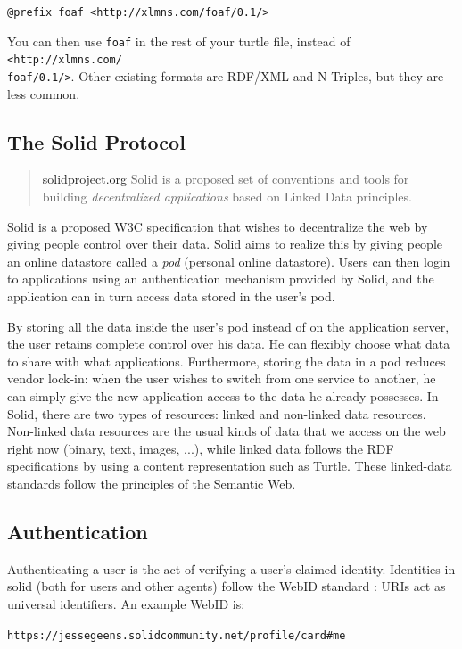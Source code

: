 \texttt{@prefix foaf <http://xlmns.com/foaf/0.1/>}

\noindent You can then use \texttt{foaf} in the rest of your turtle file, instead of \texttt{<http://xlmns.com/\\foaf/0.1/>}. Other existing formats are \gls{RDF}/XML and N-Triples, but they are less common.

\subsection{The Solid Protocol}
\begin{quote}{\href{https://solidproject.org}{solidproject.org}}
    Solid is a proposed set of conventions and tools for building \textit{decentralized applications} based on Linked Data principles.
\end{quote}
\noindent Solid \citep{solid} is a proposed W3C specification that wishes to decentralize the web by giving people control over their data. Solid aims to realize this by giving people an online datastore called a \textit{pod} (personal online datastore). Users can then login to applications using an authentication mechanism provided by Solid, and the application can in turn access data stored in the user's pod.

By storing all the data inside the user's pod instead of on the application server, the user retains complete control over his data. He can flexibly choose what data to share with what applications. Furthermore, storing the data in a pod reduces vendor lock-in: when the user wishes to switch from one service to another, he can simply give the new application access to the data he already possesses. 
In Solid, there are two types of resources: linked and non-linked data resources. Non-linked data resources are the usual kinds of data that we access on the web right now (binary, text, images, ...), while linked data follows the 
 \gls{RDF} specifications by using a content representation such as Turtle. These linked-data standards follow the principles of the Semantic Web.

\subsection{Authentication}
Authenticating a user is the act of verifying a user's claimed identity. Identities in solid (both for users and other agents) follow the WebID standard \citep{webid}: URIs act as universal identifiers. An example WebID is:

\begin{center}
   \texttt{https://jessegeens.solidcommunity.net/profile/card\#me}\\
\end{center}

